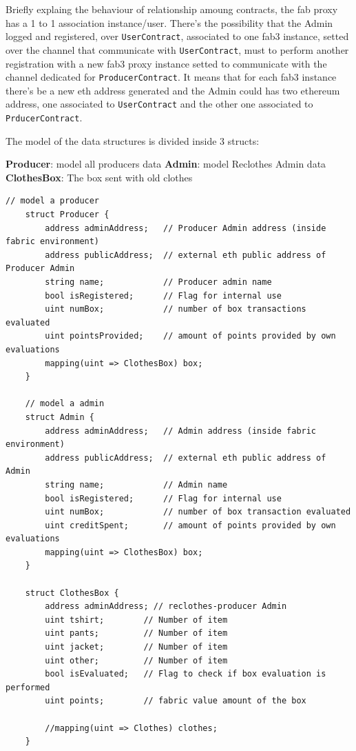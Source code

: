 Briefly explaing the behaviour of relationship amoung contracts,  the fab proxy has a 1 to 1 association 
instance/user. There's the possibility that the Admin logged and registered, over \texttt{UserContract}, associated to one fab3 instance, setted over the channel that communicate with 
\texttt{UserContract}, must to perform another registration with a new fab3 proxy instance
setted to communicate with the channel dedicated for \texttt{ProducerContract}. It means that for each
fab3 instance there's be a new eth address generated and the Admin could has two ethereum address,
one associated to \texttt{UserContract} and the other one associated to \texttt{PrducerContract}.
\bigskip


The model of the data structures is divided inside 3 structs:

\begin{outline}[enumerate]
    \1 \textbf{Producer}: model all producers data
    \1 \textbf{Admin}: model Reclothes Admin data
    \1 \textbf{ClothesBox}: The box sent with old clothes 
\end{outline}

\begin{lstlisting}[language=Solidity]
    // model a producer
    struct Producer {
        address adminAddress;   // Producer Admin address (inside fabric environment)
        address publicAddress;  // external eth public address of Producer Admin
        string name;            // Producer admin name
        bool isRegistered;      // Flag for internal use
        uint numBox;            // number of box transactions evaluated
        uint pointsProvided;    // amount of points provided by own evaluations
        mapping(uint => ClothesBox) box;
    }

    // model a admin
    struct Admin {
        address adminAddress;   // Admin address (inside fabric environment)
        address publicAddress;  // external eth public address of Admin
        string name;            // Admin name
        bool isRegistered;      // Flag for internal use
        uint numBox;            // number of box transaction evaluated
        uint creditSpent;       // amount of points provided by own evaluations
        mapping(uint => ClothesBox) box;
    }

    struct ClothesBox {
        address adminAddress; // reclothes-producer Admin
        uint tshirt;        // Number of item
        uint pants;         // Number of item
        uint jacket;        // Number of item
        uint other;         // Number of item
        bool isEvaluated;   // Flag to check if box evaluation is performed
        uint points;        // fabric value amount of the box

        //mapping(uint => Clothes) clothes;
    }
\end{lstlisting}

